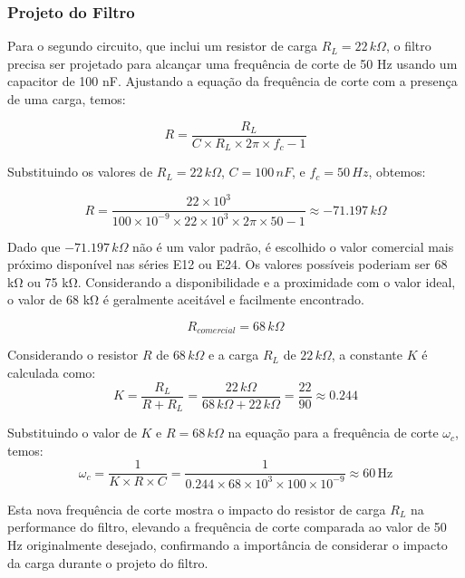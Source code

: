 \documentclass{article}
\begin{document}
\subsubsection{Projeto do Filtro}
Para o segundo circuito, que inclui um resistor de carga \( R_L = 22 \, k\Omega \), o filtro precisa ser projetado para alcançar uma frequência de corte de 50 Hz usando um capacitor de 100 nF. Ajustando a equação da frequência de corte com a presença de uma carga, temos:

\begin{equation}
    R = \frac{R_L}{C \times R_L \times 2\pi \times f_c - 1}
\end{equation}

Substituindo os valores de \( R_L = 22 \, k\Omega \), \( C = 100 \, nF \), e \( f_c = 50 \, Hz \), obtemos:

\begin{equation}
    R = \frac{22 \times 10^3}{100 \times 10^{-9} \times 22 \times 10^3 \times 2\pi \times 50 - 1} \approx -71.197 \, k\Omega
\end{equation}

Dado que \( -71.197 \, k\Omega \) não é um valor padrão, é escolhido o valor comercial mais próximo disponível nas séries E12 ou E24. Os valores possíveis poderiam ser 68 kΩ ou 75 kΩ. Considerando a disponibilidade e a proximidade com o valor ideal, o valor de 68 kΩ é geralmente aceitável e facilmente encontrado.

\begin{equation}
    R_{comercial} = 68 \, k\Omega
\end{equation}

Considerando o resistor \( R \) de \( 68 \, k\Omega \) e a carga \( R_L \) de \( 22 \, k\Omega \), a constante \( K \) é calculada como:
\begin{equation}
    K = \frac{R_L}{R + R_L} = \frac{22 \, k\Omega}{68 \, k\Omega + 22 \, k\Omega} = \frac{22}{90} \approx 0.244
\end{equation}

Substituindo o valor de \( K \) e \( R = 68 \, k\Omega \) na equação para a frequência de corte \( \omega_c \), temos:
\begin{equation}
    \omega_c = \frac{1}{K \times R \times C} = \frac{1}{0.244 \times 68 \times 10^3 \times 100 \times 10^{-9}} \approx 60 \, \text{Hz}
\end{equation}

Esta nova frequência de corte mostra o impacto do resistor de carga \( R_L \) na performance do filtro, elevando a frequência de corte comparada ao valor de 50 Hz originalmente desejado, confirmando a importância de considerar o impacto da carga durante o projeto do filtro.
\end{document}
